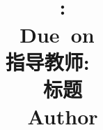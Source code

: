 \documentclass[UTF8,AutoFakeBold]{article}
\title{
	\vspace{0.2in}
	\vspace{0.8cm}\\
	\textmd{\textbf{\hmwkClass: \hmwkTitle}}\\
	\normalsize\vspace{0.1in}\small{Due\ on\ \zhtoday}\\
	\vspace{0.1in}\large{指导教师: ~\textit{\hmwkClassInstructor\ \hmwkClassTime}}\\
	\vspace{0.5in}
	\Large{标题}\\
	\vspace{0.5in}	
	\large{Author}\\
	\vspace{0.2in}
	
}
\date{}
\begin{document}
\maketitle
\pagebreak
\tableofcontents
\pagebreak


\newpage

\pagebreak

\pagebreak

\pagebreak

\end{document}
